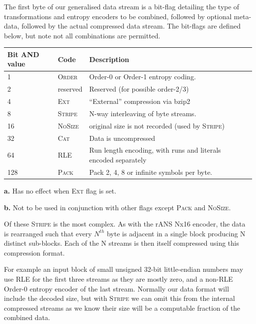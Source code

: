 \documentclass[a4paper]{article}
\begin{document}
The first byte of our generalised data stream is a bit-flag detailing the type of transformations and entropy encoders to be combined, followed by optional meta-data, followed by the actual compressed data stream.
The bit-flags are defined below, but note not all combinations are permitted.

\begin{threeparttable}[t]
\begin{tabular}{llll}
\hline
\textbf{Bit AND value} & \textbf{Code} & \textbf{Description} \\
\hline
1 & \textsc{Order}\tnote{\textbf{a}} & Order-0 or Order-1 entropy coding. \\
2 & reserved & Reserved (for possible order-2/3)\\
4 & \textsc{Ext} & ``External'' compression via bzip2\\
8 & \textsc{Stripe}\tnote{\textbf{b}} & N-way interleaving of byte streams.\\
16 & \textsc{NoSize} & original size is not recorded (used by \textsc{Stripe})\\
32 & \textsc{Cat}\tnote{\textbf{b}} & Data is uncompressed\\
64 & \textsc{RLE}\tnote{\textbf{a}} & Run length encoding, with runs and literals encoded separately\\
128 & \textsc{Pack} & Pack 2, 4, 8 or infinite symbols per byte.\\
\hline
\end{tabular}
\begin{tablenotes}
\item{\textbf{a.}} Has no effect when \textsc{Ext} flag is set.
\item{\textbf{b.}} Not to be used in conjunction with other flags
  except \textsc{Pack} and \textsc{NoSize}.
\end{tablenotes}
\end{threeparttable}

Of these \textsc{Stripe} is the most complex.
As with the rANS Nx16 encoder, the data is rearranged such that every
$N^{th}$ byte is adjacent in a single block producing N distinct sub-blocks.
Each of the N streams is then itself compressed using this compression format.

For example an input block of small unsigned 32-bit little-endian numbers may use RLE for the first three streams as they are mostly zero, and a non-RLE Order-0 entropy encoder of the last stream.
Normally our data format will include the decoded size, but with \textsc{Stripe} we can omit this from the internal compressed streams as we know their size will be a computable fraction of the combined data.
\end{document}
